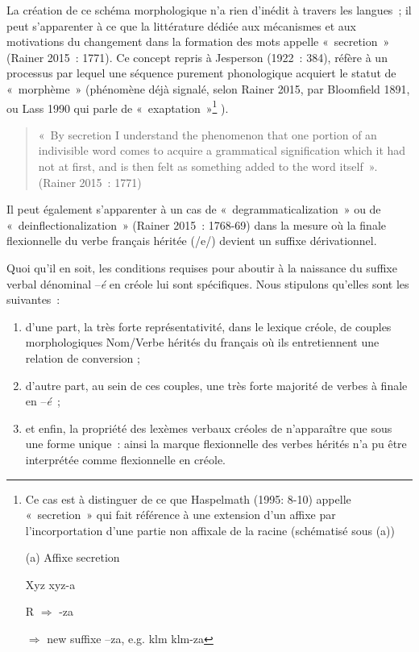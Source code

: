 \documentclass[output=paper]{langsci/langscibook}
\begin{document}
La création de ce schéma morphologique n'a rien d'inédit à travers les
langues~; il peut s'apparenter à ce que la littérature dédiée aux
mécanismes et aux motivations du changement dans la formation des mots
appelle «~secretion~» (Rainer 2015~: 1771). Ce concept repris à
Jesperson (1922~: 384), réfère à un processus par lequel une séquence
purement phonologique acquiert le statut de «~morphème~» (phénomène déjà
signalé, selon Rainer 2015, par Bloomfield 1891, ou Lass 1990 qui parle
de «~exaptation~»\footnote{Ce cas est à distinguer de
  ce que Haspelmath (1995: 8-10) appelle «~secretion~» qui fait
  référence à une extension d'un affixe par l'incorportation d'une
  partie non affixale de la racine (schématisé sous (a))

  (a) Affixe secretion

  Xyz \textrightarrow{} xyz-a

  R $\Rightarrow$ -za

  $\Rightarrow$ new suffixe --za, e.g. klm \textrightarrow{} klm-za}%
).


  \begin{quote}
«~By secretion I understand the phenomenon that one portion of an
indivisible word comes to acquire a grammatical signification which it
had not at first, and is then felt as something added to the word
itself~». (Rainer 2015~: 1771)
\end{quote}

Il peut également s'apparenter à un cas de «~degrammaticalization~» ou
de «~deinflectionalization~» (Rainer 2015~: 1768-69) dans la mesure où
la finale flexionnelle du verbe français héritée (/e/) devient un
suffixe dérivationnel.

Quoi qu'il en soit, les conditions requises pour aboutir à la naissance
du suffixe verbal dénominal --\emph{é} en créole lui sont spécifiques.
Nous stipulons qu'elles sont les suivantes~:

\begin{enumerate}
\def\labelenumi{\arabic{enumi})}

\item
  d'une part, la très forte représentativité, dans le lexique créole, de
  couples morphologiques Nom/Verbe hérités du français où ils
  entretiennent une relation de conversion ;
\item
  d'autre part, au sein de ces couples, une très forte majorité de
  verbes à finale en --\emph{é}~;
\item
  et enfin, la propriété des lexèmes verbaux créoles de n'apparaître que
  sous une forme unique~: ainsi la marque flexionnelle des verbes
  hérités n'a pu être interprétée comme flexionnelle en créole.
\end{enumerate}
\end{document}

